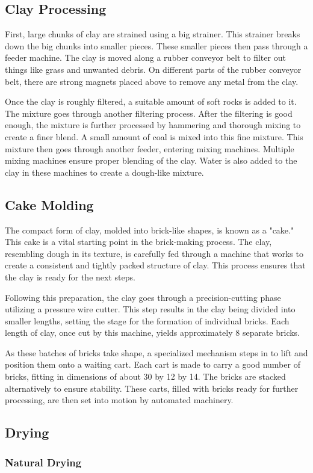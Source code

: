 \subsection*{Clay Processing}
First, large chunks of clay are strained using a big strainer. This strainer breaks down the big chunks into smaller pieces. These smaller pieces then pass through a feeder machine. The clay is moved along a rubber conveyor belt to filter out things like grass and unwanted debris. On different parts of the rubber conveyor belt, there are strong magnets placed above to remove any metal from the clay.

Once the clay is roughly filtered, a suitable amount of soft rocks is added to it. The mixture goes through another filtering process. After the filtering is good enough, the mixture is further processed by hammering and thorough mixing to create a finer blend. A small amount of coal is mixed into this fine mixture. This mixture then goes through another feeder, entering mixing machines. Multiple mixing machines ensure proper blending of the clay. Water is also added to the clay in these machines to create a dough-like mixture.

\subsection*{Cake Molding}
The compact form of clay, molded into brick-like shapes, is known as a "cake." This cake is a vital starting point in the brick-making process. The clay, resembling dough in its texture, is carefully fed through a machine that works to create a consistent and tightly packed structure of clay. This process ensures that the clay is ready for the next steps.

Following this preparation, the clay goes through a precision-cutting phase utilizing a pressure wire cutter. This step results in the clay being divided into smaller lengths, setting the stage for the formation of individual bricks. Each length of clay, once cut by this machine, yields approximately 8 separate bricks.

As these batches of bricks take shape, a specialized mechanism steps in to lift and position them onto a waiting cart. Each cart is made to carry a good number of bricks, fitting in dimensions of about 30 by 12 by 14. The bricks are stacked alternatively to ensure stability. These carts, filled with bricks ready for further processing, are then set into motion by automated machinery.

\subsection*{Drying}

\subsubsection*{Natural Drying}